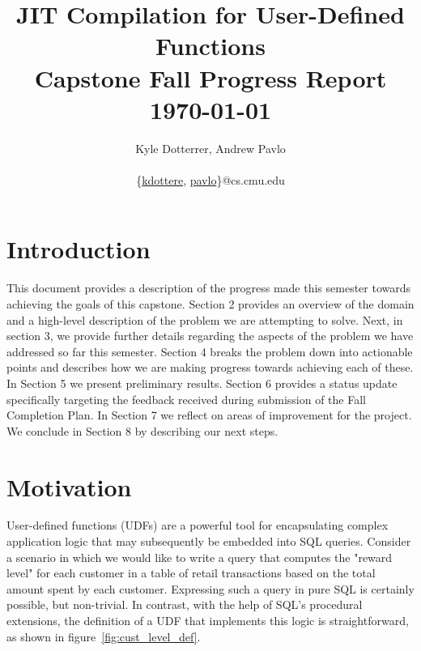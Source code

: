 \documentclass{vldb}
\newcommand{\paperTitle}{JIT Compilation for User-Defined Functions\\ 
    \large Capstone Fall Progress Report\\
    \today}
\begin{document}
\title{\paperTitle}

\author{
    \alignauthor Kyle Dotterrer, Andrew Pavlo\\
    \\
    \email 
        \{\href{mailto:kdottere@cs.cmu.edu}{kdottere},
        \href{mailto:pavlo@cs.cmu.edu}{pavlo}\}@cs.cmu.edu\\
}

\makeatletter
\def\@copyrightspace{\relax}
\makeatother

\maketitle


\section{Introduction}

This document provides a description of the progress made this semester towards achieving the goals of this capstone. Section 2 provides an overview of the domain and a high-level description of the problem we are attempting to solve. Next, in section 3, we provide further details regarding the aspects of the problem we have addressed so far this semester. Section 4 breaks the problem down into actionable points and describes how we are making progress towards achieving each of these. In Section 5 we present preliminary results. Section 6 provides a status update specifically targeting the feedback received during submission of the Fall Completion Plan. In Section 7 we reflect on areas of improvement for the project. We conclude in Section 8 by describing our next steps.


\section{Motivation}

User-defined functions (UDFs) are a powerful tool for encapsulating complex application logic that may subsequently be embedded into SQL queries. Consider a scenario in which we would like to write a query that computes the "reward level" for each customer in a table of retail transactions based on the total amount spent by each customer. Expressing such a query in pure SQL is certainly possible, but non-trivial. In contrast, with the help of SQL's procedural extensions, the definition of a UDF that implements this logic is straightforward, as shown in figure~\ref{fig:cust_level_def}.
\end{document}
